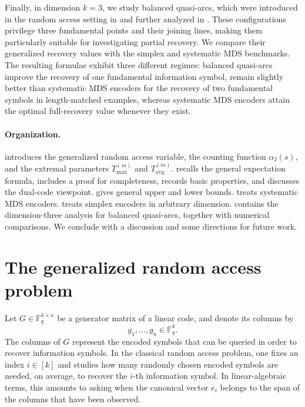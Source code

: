 \documentclass[11pt,a4paper]{article}
\numberwithin{equation}{section}
\theoremstyle{definition}
\theoremstyle{definition}
\newcommand{\F}{\mathbb{F}}
\newcommand{\Tmax}{T_{\max}}
\newcommand{\Tavg}{T_{\mathrm{avg}}}
\begin{document}
Finally, in dimension $k=3$, we study balanced quasi-arcs, which were introduced in the random access setting in \cite{gruica2024geometry} and further analyzed in \cite{bodur2025randomvariables}. These configurations privilege three fundamental points and their joining lines, making them particularly suitable for investigating partial recovery. We compare their generalized recovery values with the simplex and systematic MDS benchmarks. The resulting formulae exhibit three different regimes: balanced quasi-arcs improve the recovery of one fundamental information symbol, remain slightly better than systematic MDS encoders for the recovery of two fundamental symbols in length-matched examples, whereas systematic MDS encoders attain the optimal full-recovery value whenever they exist.





\paragraph{Organization.}
 introduces the generalized random access variable, the counting function $\alpha_I(s)$, and the extremal parameters $\Tmax^{(m)}$ and $\Tavg^{(m)}$. { recalls the general expectation formula, includes a proof for completeness, records basic properties, and discusses the dual-code viewpoint.}   gives general upper and lower bounds.   treats systematic MDS encoders.   treats simplex encoders in arbitrary dimension.   contains the dimension-three analysis for balanced quasi-arcs, together with numerical comparisons.  We conclude with a discussion and some directions for future work.


\section{The generalized random access problem}\label{sec:model}

Let $G\in \F_q^{k\times n}$ be a generator matrix of a linear code, and denote its columns by
\[
g_1,\ldots,g_n\in \F_q^k.
\]
The columns of $G$ represent the encoded symbols that can be queried in order to recover information symbols.  In the classical random access problem, one fixes an index $i\in [k]$ and studies how many randomly chosen encoded symbols are needed, on average, to recover the $i$-th information symbol.  In linear-algebraic terms, this amounts to asking when the canonical vector $e_i$ belongs to the span of the columns that have been observed.
\end{document}
